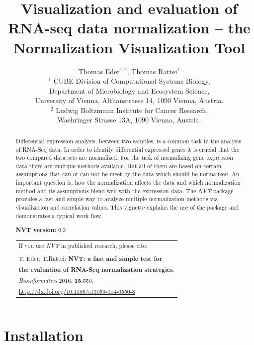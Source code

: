 \documentclass[11pt]{article}\usepackage[]{graphicx}\usepackage[]{color}
\author{Thomas Eder$^{1,2}$, Thomas Rattei$^{1}$\\[1em]
  \small{$^{1}$ CUBE Division of Computational Systems Biology,} \\
  \small{Department of Microbiology and Ecosystem Science,} \\
  \small{University of Vienna, Althanstrasse 14, 1090 Vienna, Austria. } \\
  \small{$^{2}$ Ludwig Boltzmann Institute for Cancer Research,} \\
  \small{Waehringer Strasse 13A, 1090 Vienna, Austria.} }
\title{Visualization and evaluation of RNA-seq data normalization -- the Normalization Visualization Tool}
\newcommand{\nvt}{\textit{NVT}}
\begin{document}
\maketitle

\begin{abstract}

Differential expression analysis, between two samples, is a common task in the analysis of RNA-Seq data. In order to identify differential expressed genes it is crucial that the two compared data sets are normalized. For the task of normalizing gene expression data there are multiple methods available. But all of them are based on certain assumptions that can or can not be meet by the data which should be normalized. An important question is, how the normalization affects the data and which normalization method and its assumptions blend well with the expression data. The \nvt{} package provides a fast and simple way to analyze multiple normalization methods via visualization and correlation values. This vignette explains the use of the package and demonstrates a typical work flow.

  \vspace{1em}

  \textbf{NVT version:} 0.3

  \vspace{1em}

  \begin{center}
    \begin{tabular}{ | l | }
      \hline
      If you use \nvt{} in published research, please cite:  \\
      \\
      T. Eder, T.Rattei: \textbf{NVT: a fast and simple test for} \\
      \textbf{the evaluation of RNA-Seq normalization strategies}. \\
      \emph{Bioinformatics} 2016, \textbf{15}:550. \\
      \url{http://dx.doi.org/10.1186/s13059-014-0550-8}  \\
      \hline
    \end{tabular}
  \end{center}

\end{abstract}


\newpage

\tableofcontents

\newpage

\section{Installation}
\end{document}
